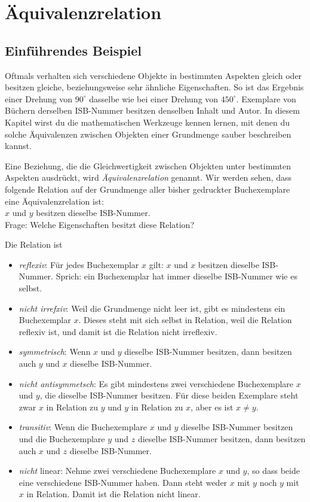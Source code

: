 


\section{Äquivalenzrelation}

\subsection{Einführendes Beispiel}
Oftmals verhalten sich verschiedene Objekte in bestimmten Aspekten gleich oder besitzen gleiche, beziehungsweise sehr ähnliche Eigenschaften. So ist das Ergebnis einer Drehung von $90^\circ$ dasselbe wie bei einer Drehung von $450^\circ$. Exemplare von Büchern derselben ISB-Nummer besitzen denselben Inhalt und Autor. In diesem Kapitel wirst du die mathematischen Werkzeuge kennen lernen, mit denen du solche Äquivalenzen zwischen Objekten einer Grundmenge sauber beschreiben kannst.

Eine Beziehung, die die Gleichwertigkeit zwischen Objekten unter bestimmten Aspekten ausdrückt, wird \textit{Äquivalenzrelation} genannt. Wir werden sehen, dass folgende Relation auf der Grundmenge aller bisher gedruckter Buchexemplare eine Äquivalenzrelation ist:\\
\noindent\hspace*{10mm}$x$ und $y$ besitzen dieselbe ISB-Nummer.\\

Frage: Welche Eigenschaften besitzt diese Relation?

Die Relation ist

\begin{itemize}
\item  \textit{reflexiv}: Für jedes Buchexemplar $x$ gilt: $x$ und $x$ besitzen dieselbe ISB-Nummer. Sprich: ein Buchexemplar hat immer dieselbe ISB-Nummer wie es selbst.
\item  \textit{nicht irrefxiv}: Weil die Grundmenge nicht leer ist, gibt es mindestens ein Buchexemplar $x$. Dieses steht mit sich selbst in Relation, weil die Relation reflexiv ist, und damit ist die Relation nicht irreflexiv.
\item  \textit{symmetrisch}: Wenn $x$ und $y$ dieselbe ISB-Nummer besitzen, dann besitzen auch $y$ und $x$ dieselbe ISB-Nummer.
\item  \textit{nicht antisymmetsch}: Es gibt mindestens zwei verschiedene Buchexemplare $x$ und $y$, die dieselbe ISB-Nummer besitzen. Für diese beiden Exemplare steht zwar $x$ in Relation zu $y$ und $y$ in Relation zu $x$, aber es ist $x\ne y$.
\item  \textit{transitiv}: Wenn die Buchexemplare $x$ und $y$ dieselbe ISB-Nummer besitzen und die Buchexemplare $y$ und $z$ dieselbe ISB-Nummer besitzen, dann besitzen auch $x$ und $z$ dieselbe ISB-Nummer.
\item  \textit{nicht }linear: Nehme zwei verschiedene Buchexemplare $x$ und $y$, so dass beide eine verschiedene ISB-Nummer haben. Dann steht weder $x$ mit $y$ noch $y$ mit $x$ in Relation. Damit ist die Relation nicht linear.
\end{itemize}

